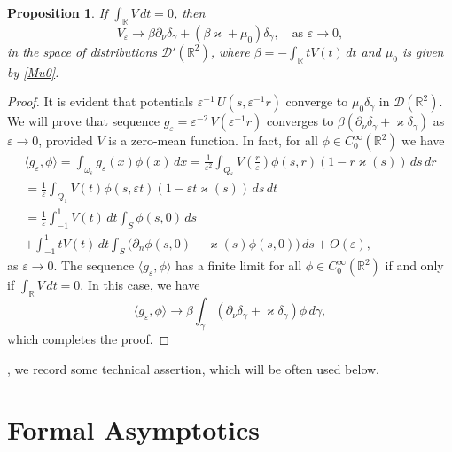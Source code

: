 \documentclass[reqno]{amsart}
\theoremstyle{plain}
\newtheorem{prop}{Proposition}
\numberwithin{equation}{section}
\renewcommand{\kappa}{\varkappa}
\newcommand{\Real}{\mathbb R}
\newcommand{\eps}{\varepsilon}
\newcommand{\rd}[1]{{\color{red}{#1}}}
\begin{document}
\begin{prop}\label{PropVepsConverg}
If $\int_\Real V\,dt=0$, then
\begin{equation*}
   V_\eps\to \beta\partial_\nu\delta_\gamma+\left(\beta\kappa+\mu_0\right) \delta_\gamma,\quad \mbox{as } \eps\to 0,
\end{equation*}
in the space of distributions $\mathcal{D}'(\Real^2)$, where
$\beta=-\int_\Real t V(t)\,dt$ and $\mu_0$ is given by \eqref{Mu0}.
\end{prop}
\begin{proof}
It is evident that potentials $\eps^{-1}\,U\left(s,\eps^{-1}r\right)$
converge to $\mu_0 \delta_\gamma$ in $\mathcal{D}(\Real^2)$.
We will prove that sequence $g_\eps=\eps^{-2}\,V\left(\eps^{-1}r\right)$ converges to
$\beta\left(\partial_\nu\delta_\gamma+\kappa\delta_\gamma\right)$ as $\eps\to 0$, provided $V$ is a zero-mean function.
In fact, for all $\phi\in C^\infty_0(\Real^2)$ we have
\begin{multline*}
\langle g_\eps, \phi \rangle=\int_{\omega_\eps}g_\eps(x)\phi(x)\,dx
=
\frac{1}{\eps^2}\int_{Q_\eps} V\left(\frac{r}{\eps}\right)\phi(s,r)(1-r\kappa(s))\,ds\,dr
\\
 =
\frac{1}{\eps}\int_{Q_1} V(t)\phi(s,\eps t)(1-\eps t\kappa(s))\,ds\,dt
\\
=\frac{1}{\eps}\int_{-1}^1 V(t)\,dt \int_S\phi(s,0)\,ds
\\
+
\int_{-1}^1 t V(t)\,dt \int_S\big(\partial_n\phi(s,0)-\kappa(s)\phi(s,0)\big)\,ds+O(\eps),
\end{multline*}
as $\eps\to 0$.
The sequence $\langle g_\eps, \phi \rangle$ has a finite limit for all $\phi\in C^\infty_0(\Real^2)$ if and only if $\int_\Real V\,dt=0$.
In this case, we have
\begin{equation*}
\langle g_\eps, \phi \rangle\to \beta\int_\gamma\left(\partial_\nu\delta_\gamma+\kappa \delta_\gamma\right)\phi\,d\gamma,
\end{equation*}
which completes the proof.
\end{proof}

\rd{At the end of the section},  we record some technical assertion, which  will be often used below.



\section{Formal Asymptotics}
\end{document}
